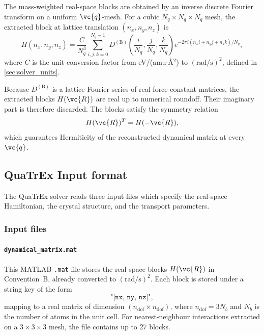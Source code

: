 The mass-weighted real-space blocks are obtained by an inverse discrete
Fourier transform on a uniform $\vc{q}$-mesh.  For a cubic
$N_q\times N_q\times N_q$ mesh, the extracted block at lattice
translation $(n_x,n_y,n_z)$ is
\begin{equation}\label{eq:idft}
  H(n_x,n_y,n_z)
  = \frac{C}{N_q^3}
    \sum_{i,j,k=0}^{N_q-1}
    D^{(\mathrm{B})}\!\left(\frac{i}{N_q},
                            \frac{j}{N_q},
                            \frac{k}{N_q}\right)
    e^{-2\pi i(n_x i + n_y j + n_z k)/N_q},
\end{equation}
where $C$ is the unit-conversion factor from
eV/(amu$\cdot$\AA$^2$) to $(\mathrm{rad/s})^2$, defined in
\cref{sec:solver_units}.

Because $D^{(\mathrm{B})}$ is a lattice Fourier series of real
force-constant matrices, the extracted blocks $H(\vc{R})$ are real up
to numerical roundoff.  Their imaginary part is therefore discarded. The blocks satisfy the symmetry relation
\begin{equation}\label{eq:sym}
  H(\vc{R})^T = H(-\vc{R}),
\end{equation}
which guarantees Hermiticity of the reconstructed dynamical matrix at
every $\vc{q}$.

\subsection{QuaTrEx Input format}
\label{sec:quatrex_input}

The QuaTrEx solver reads three input files which
specify the real-space Hamiltonian, the crystal structure, and the
transport parameters.

\subsubsection{Input files}
\label{sec:input_files}

\paragraph{\texttt{dynamical\_matrix.mat}}
This MATLAB \texttt{.mat} file stores the real-space blocks
$H(\vc{R})$ in Convention~B, already converted to
$(\mathrm{rad/s})^2$.  Each block is stored under a string key of the
form
\begin{equation}
  \texttt{"[nx, ny, nz]"},
\end{equation}
mapping to a real matrix of dimension
$(n_\mathrm{dof}\times n_\mathrm{dof})$, where
$n_\mathrm{dof}=3N_b$ and $N_b$ is the number of atoms in the unit
cell.  For nearest-neighbour interactions extracted on a
$3\times3\times3$ mesh, the file contains up to 27 blocks.

